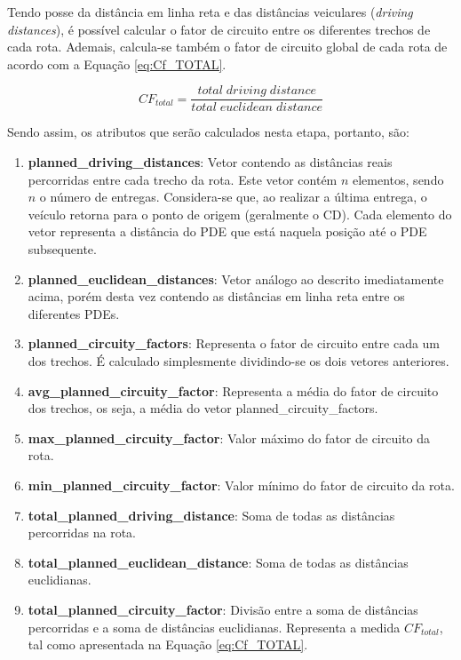 Tendo posse da distância em linha reta e das distâncias veiculares (\textit{driving distances}), é possível calcular o fator de circuito entre os diferentes trechos de cada rota.
Ademais, calcula-se também o fator de circuito global de cada rota de acordo com a Equação \ref{eq:Cf_TOTAL}.

\begin{equation} \label{eq:Cf_TOTAL}
    CF_{total} = \frac{total\;driving\;distance}{total\;euclidean\;distance}
\end{equation}

Sendo assim, os atributos que serão calculados nesta etapa, portanto, são: 
\begin{enumerate}
    \item \textbf{planned\_driving\_distances}: Vetor contendo as distâncias reais percorridas entre cada trecho da rota. Este vetor contém $n$ elementos, sendo $n$ o número de entregas. Considera-se que, ao realizar a última entrega, o veículo retorna para o ponto de origem (geralmente o CD). Cada elemento do vetor representa a distância do PDE que está naquela posição até o PDE subsequente. 
    \item \textbf{planned\_euclidean\_distances}: Vetor análogo ao descrito imediatamente acima, porém desta vez contendo as distâncias em linha reta entre os diferentes PDEs.
    \item \textbf{planned\_circuity\_factors}: Representa o fator de circuito entre cada um dos trechos. É calculado simplesmente dividindo-se os dois vetores anteriores.
    \item \textbf{avg\_planned\_circuity\_factor}: Representa a média do fator de circuito dos trechos, os seja, a média do vetor planned\_circuity\_factors.
    \item \textbf{max\_planned\_circuity\_factor}: Valor máximo do fator de circuito da rota.
    \item \textbf{min\_planned\_circuity\_factor}: Valor mínimo do fator de circuito da rota.
    \item \textbf{total\_planned\_driving\_distance}: Soma de todas as distâncias percorridas na rota.
    \item \textbf{total\_planned\_euclidean\_distance}: Soma de todas as distâncias euclidianas.
    \item \textbf{total\_planned\_circuity\_factor}: Divisão entre a soma de distâncias percorridas e a soma de distâncias euclidianas. Representa a medida $CF_{total}$, tal como apresentada na Equação \ref{eq:Cf_TOTAL}.
\end{enumerate}

